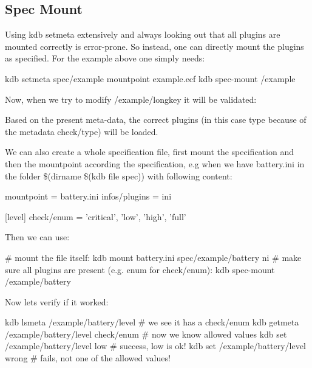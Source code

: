 \subsection*{Spec Mount}

Using {\ttfamily kdb setmeta} extensively and always looking out that all plugins are mounted correctly is error-\/prone. So instead, one can directly mount the plugins as specified. For the example above one simply needs\+: \begin{DoxyVerb}    kdb setmeta spec/example mountpoint example.ecf
    kdb spec-mount /example
\end{DoxyVerb}


Now, when we try to modify {\ttfamily /example/longkey} it will be validated\+: 


Based on the present meta-\/data, the correct plugins (in this case {\ttfamily type} because of the metadata {\ttfamily check/type}) will be loaded.

We can also create a whole specification file, first mount the specification and then the mountpoint according the specification, e.\+g when we have {\ttfamily battery.\+ini} in the folder {\ttfamily \$(dirname \$(kdb file spec))} with following content\+: \begin{DoxyVerb}    []
    mountpoint = battery.ini
    infos/plugins = ini

    [level]
    check/enum = 'critical', 'low', 'high', 'full'
\end{DoxyVerb}


Then we can use\+: \begin{DoxyVerb}    # mount the file itself:
    kdb mount battery.ini spec/example/battery ni
    # make sure all plugins are present (e.g. enum for check/enum):
    kdb spec-mount /example/battery
\end{DoxyVerb}


Now lets verify if it worked\+: \begin{DoxyVerb}    kdb lsmeta /example/battery/level
    # we see it has a check/enum
    kdb getmeta /example/battery/level check/enum
    # now we know allowed values
    kdb set /example/battery/level low
    # success, low is ok!
    kdb set /example/battery/level wrong
    # fails, not one of the allowed values!
\end{DoxyVerb}


